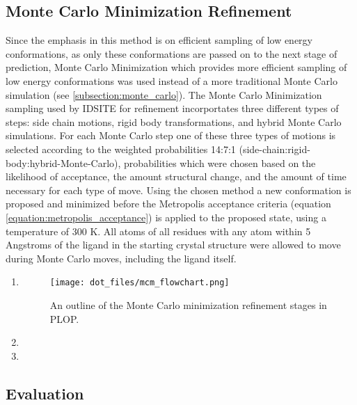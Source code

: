 \subsection{Monte Carlo Minimization Refinement}
\label{subsection:p450/mcm}
Since the emphasis in this method is on efficient sampling of low energy conformations, as only these conformations are passed on to the next stage of prediction, Monte Carlo Minimization which provides more efficient sampling of low energy conformations was used instead of a more traditional Monte Carlo simulation (see \ref{subsection:monte_carlo}).
The Monte Carlo Minimization sampling used by IDSITE for refinement incorportates three different types of steps: side chain motions, rigid body transformations, and hybrid Monte Carlo simulations.
For each Monte Carlo step one of these three types of motions is selected according to the weighted probabilities 14:7:1 (side-chain:rigid-body:hybrid-Monte-Carlo), probabilities which were chosen based on the likelihood of acceptance, the amount structural change, and the amount of time necessary for each type of move.
Using the chosen method a new conformation is proposed and minimized before the Metropolis acceptance criteria (equation \ref{equation:metropolis_acceptance}) is applied to the proposed state, using a temperature of 300 K.
All atoms of all residues with any atom within 5 Angstroms of the ligand in the starting crystal structure were allowed to move during Monte Carlo moves, including the ligand itself.

\begin{enumerate}
\item 
\begin{figure}[h]
\centering
\texttt{[image: dot\_files/mcm\_flowchart.png]}
\caption{An outline of the Monte Carlo minimization refinement stages in PLOP.}
\label{fig:mcm_flowchart}
\end{figure}
\item 
\item 
\end{enumerate}

\subsection{Evaluation}
\label{subsection:p450/evaluation}

